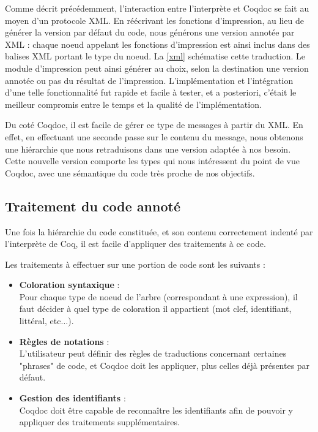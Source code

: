 \documentclass[a4paper, 11pt]{report}
\begin{document}
    Comme décrit précédemment, l'interaction entre l'interprète et Coqdoc se
    fait au moyen d'un protocole XML. En réécrivant les fonctions d'impression,
    au lieu de générer la version par défaut du code, nous générons une version
    annotée par XML : chaque noeud appelant les fonctions d'impression est
    ainsi inclus dans des balises XML portant le type du noeud. La \cref{xml} schématise
    cette traduction. Le module d'impression peut ainsi générer au choix,
    selon la destination une version annotée ou pas du résultat de
    l'impression. L'implémentation et l'intégration d'une telle fonctionnalité
    fut rapide et facile à tester, et a posteriori, c'était le meilleur compromis
    entre le temps et la qualité de l'implémentation.
    
    
    \clearpage

    Du coté Coqdoc, il est facile de gérer ce type de messages à partir du XML.
    En effet, en effectuant une seconde passe sur le contenu du message, nous
    obtenons une hiérarchie que nous retraduisons dans une version adaptée à
    nos besoin. Cette nouvelle version comporte les types qui nous intéressent
    du point de vue Coqdoc, avec une sémantique du code très proche de nos
    objectifs.

    \subsection{Traitement du code annoté}
    Une fois la hiérarchie du code constituée, et son contenu correctement
    indenté par l'interprète de Coq, il est facile d'appliquer des traitements
    à ce code.

    Les traitements à effectuer sur une portion de code sont les suivants :
    \begin{itemize}
      \item \textbf{Coloration syntaxique} : \\
        Pour chaque type de noeud de l'arbre (correspondant à une expression),
        il faut décider à quel type de coloration il appartient (mot clef,
        identifiant, littéral, etc$\ldots$).
      \item \textbf{Règles de notations} : \\
        L'utilisateur peut définir des règles de traductions concernant
        certaines "phrases" de code, et Coqdoc doit les appliquer, plus celles
        déjà présentes par défaut.
      \item \textbf{Gestion des identifiants} : \\
        Coqdoc doit être capable de reconnaître les identifiants afin de pouvoir
        y appliquer des traitements supplémentaires.
    \end{itemize}
\end{document}

